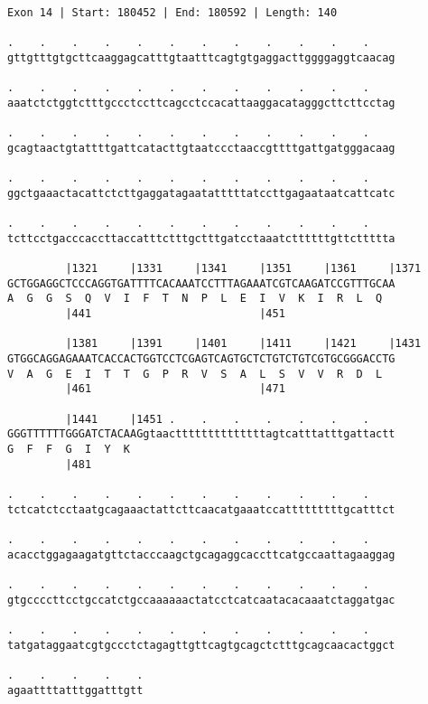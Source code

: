 \documentclass{article}
\begin{document}
\begin{Verbatim}[fontfamily=courier]
Exon 14 | Start: 180452 | End: 180592 | Length: 140

.    .    .    .    .    .    .    .    .    .    .    .    
gttgtttgtgcttcaaggagcatttgtaatttcagtgtgaggacttggggaggtcaacag

.    .    .    .    .    .    .    .    .    .    .    .    
aaatctctggtctttgccctccttcagcctccacattaaggacatagggcttcttcctag

.    .    .    .    .    .    .    .    .    .    .    .    
gcagtaactgtattttgattcatacttgtaatccctaaccgttttgattgatgggacaag

.    .    .    .    .    .    .    .    .    .    .    .    
ggctgaaactacattctcttgaggatagaatatttttatccttgagaataatcattcatc

.    .    .    .    .    .    .    .    .    .    .    .    
tcttcctgacccaccttaccatttctttgctttgatcctaaatcttttttgttcttttta

         |1321     |1331     |1341     |1351     |1361     |1371
GCTGGAGGCTCCCAGGTGATTTTCACAAATCCTTTAGAAATCGTCAAGATCCGTTTGCAA
A  G  G  S  Q  V  I  F  T  N  P  L  E  I  V  K  I  R  L  Q  
         |441                          |451                 

         |1381     |1391     |1401     |1411     |1421     |1431
GTGGCAGGAGAAATCACCACTGGTCCTCGAGTCAGTGCTCTGTCTGTCGTGCGGGACCTG
V  A  G  E  I  T  T  G  P  R  V  S  A  L  S  V  V  R  D  L  
         |461                          |471                 

         |1441     |1451 .    .    .    .    .    .    .    
GGGTTTTTTGGGATCTACAAGgtaacttttttttttttttagtcatttatttgattactt
G  F  F  G  I  Y  K                                         
         |481                                               

.    .    .    .    .    .    .    .    .    .    .    .    
tctcatctcctaatgcagaaactattcttcaacatgaaatccatttttttttgcatttct

.    .    .    .    .    .    .    .    .    .    .    .    
acacctggagaagatgttctacccaagctgcagaggcaccttcatgccaattagaaggag

.    .    .    .    .    .    .    .    .    .    .    .    
gtgccccttcctgccatctgccaaaaaactatcctcatcaatacacaaatctaggatgac

.    .    .    .    .    .    .    .    .    .    .    .    
tatgataggaatcgtgccctctagagttgttcagtgcagctctttgcagcaacactggct

.    .    .    .    .
agaattttatttggatttgtt
\end{Verbatim}
\newpage
\end{document}
